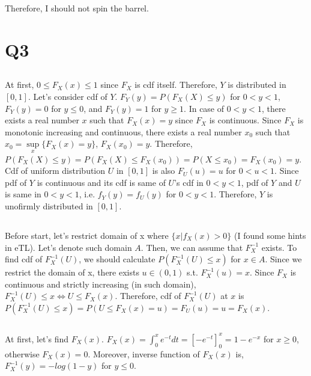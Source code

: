 \documentclass{article}
\begin{document}
Therefore, I should not spin the barrel.

\section{Q3}

\subsection{}
At first, $0 \leq F_X(x) \leq 1$ since $F_X$ is cdf itself.
Therefore, $Y$ is distributed in $[0,1]$.
Let's consider cdf of $Y$.
$F_Y(y) = P(F_X(X) \leq y)$ for $0 < y < 1$, $F_Y(y) = 0$ for $y \leq 0$,
    and $F_Y(y) = 1$ for $y \geq 1$.
In case of $0 < y < 1$, there exists a real number $x$ such that $F_X(x)=y$
    since $F_X$ is continuous.
Since $F_X$ is monotonic increasing and continuous,
    there exists a real number $x_0$
    such that $x_0 = \sup\limits_{x}\{F_X(x)=y\}$, $F_X(x_0)=y$.
Therefore,
$P(F_X(X) \leq y)
= P(F_X(X) \leq F_X(x_0))
= P(X \leq x_0)
= F_X(x_0)
= y$.
Cdf of uniform distribution $U$ in $[0,1]$ is also $F_U(u)=u$ for $0 < u < 1$.
Since pdf of $Y$ is continuous and its cdf is same of $U$'s cdf in $0 < y < 1$,
    pdf of $Y$ and $U$ is same in $0 < y < 1$, i.e. $f_Y(y)=f_U(y)$ for $0 < y < 1$.
Therefore, $Y$ is unofirmly distributed in $[0,1]$.

\subsection{}
Before start, let's restrict domain of x where $\{x|f_X(x) > 0\}$ (I found some hints in eTL).
Let's denote such domain $A$.
Then, we can assume that $F_X^{-1}$ exists.
To find cdf of $F_X^{-1}(U)$, we should calculate $P(F_X^{-1}(U) \leq x)$ for $x \in A$.
Since we restrict the domain of x, there exists $u \in (0,1)$ s.t. $F_X^{-1}(u)=x$.
Since $F_X$ is continuous and strictly increasing (in such domain),
    $F_X^{-1}(U) \leq x \iff U \leq F_X(x)$.
Therefore, cdf of $F_X^{-1}(U)$ at $x$ is
$P(F_X^{-1}(U) \leq x)
= P(U \leq F_X(x) = u)
= F_U(u)
= u
= F_X(x)$.

\subsection{}
At first, let's find $F_X(x)$.
$F_X(x) = \int_{0}^{x}e^{-t}dt
= [-e^{-t}]_{0}^{x}
= 1 - e^{-x}$
for $x \geq 0$, otherwise $F_X(x)=0$.
Moreover, inverse function of $F_X(x)$ is,
$F_X^{-1}(y) = -log(1-y)$ for $y \leq 0$. \\
\end{document}
